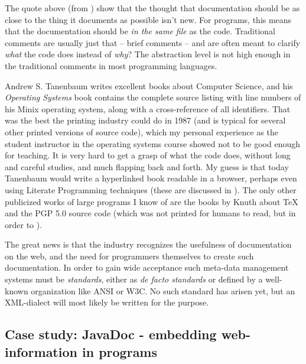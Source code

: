 The quote above (from \cite{brooks:the-mythical-man-month}) show that
the thought that documentation should be as close to the thing it
documents as possible isn't new.  For programs, this means that the
documentation should be \textit{in the same file} as the code.
Traditional comments are usually just that -- brief comments -- and
are often meant to clarify \textit{what} the code does instead of
\textit{why}?  The abstraction level is not high enough in the
traditional comments in most programming languages.

Andrew S. Tanenbaum writes excellent books about Computer Science, and
his \textit{Operating Systems} book \cite{tanenbaumoperatingsystems}
contains the complete source listing with line numbers of his Minix
operating system, along with a cross-reference of all identifiers.
That was the best the printing industry could do in 1987 (and is
typical for several other printed versions of source code), which my
personal experience as the student instructor in the operating systems
course showed not to be good enough for teaching.  It is very hard to
get a grasp of what the code does, without long and careful studies,
and much flapping back and forth.  My guess is that today Tanenbaum
would write a hyperlinked book readable in a browser, perhaps even
using Literate Programming techniques (these are discussed in
).  The only other publicized works
of large programs I know of are the books by Knuth about {\TeX} and
the PGP 5.0 source code (which was not printed for humans to read, but
in order to ).

The great news is that the industry recognizes the
usefulness of documentation on the web, and the need for
programmers themselves to create such documentation.  In
order to gain wide acceptance such meta-data management
systems must be \textit{standards}, either as \textit{de
  facto standards} or defined by a well-known organization
like ANSI or W3C.  No such standard has arisen yet, but an
XML-dialect will most likely be written for the purpose.


\subsection{Case study: JavaDoc - embedding web-information in programs}
\label{sec:javadoc}


